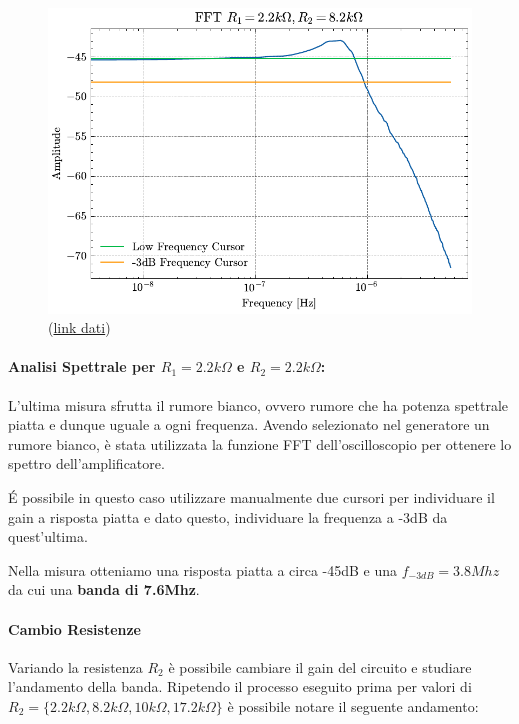 \begin{figure}
    \centering
    \includegraphics[width=\linewidth]{analog/assets/OP27/Non Invertente/FFT_2k2.pdf}
    \caption{ (\href{https://github.com/Yedi278/Esperimentazioni-Elettronica/tree/main/-\%20OPAMP/OP27/Non-Invertente/R1\%3D2.2k\%2CR2\%3D2.2k}{link dati})}    
\end{figure}

\paragraph{Analisi Spettrale per  $R_1=2.2k\Omega$ e $R_2=2.2k\Omega$:}
L'ultima misura sfrutta il rumore bianco, ovvero rumore che ha potenza spettrale piatta e dunque uguale a ogni frequenza.
Avendo selezionato nel generatore un rumore bianco, è stata utilizzata la funzione FFT dell'oscilloscopio per ottenere lo spettro dell'amplificatore.





\'E possibile in questo caso utilizzare manualmente due cursori per individuare il gain a risposta piatta e dato questo, individuare la frequenza a -3dB da quest'ultima.


 Nella misura otteniamo una risposta piatta a circa -45dB e una $f_{-3dB} = 3.8Mhz$ da cui una \textbf{banda di 7.6Mhz}.

\paragraph{Cambio Resistenze}
Variando la resistenza $R_2$ è possibile cambiare il gain del circuito e studiare l'andamento della banda.
Ripetendo il processo eseguito prima per valori di $R_2 = \{2.2k\Omega, 8.2k\Omega, 10k\Omega, 17.2k\Omega\}$ è possibile notare il seguente andamento: 

